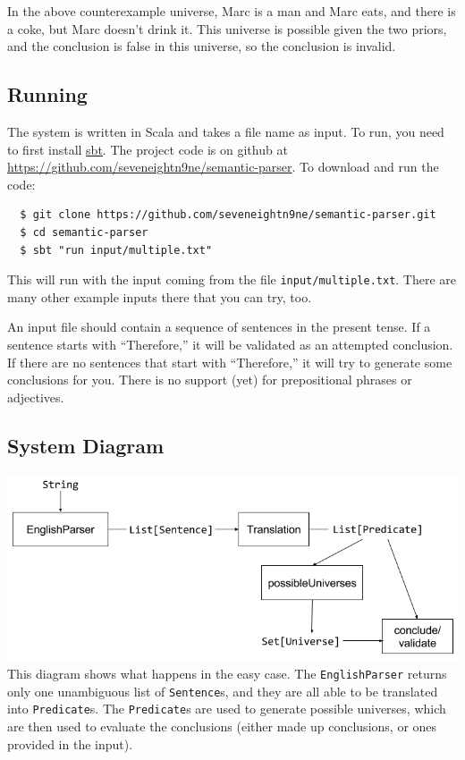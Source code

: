 \documentclass[a4paper, 11pt]{article}
\begin{document}
In the above counterexample universe, Marc is a man and Marc eats, and there is a coke, but Marc doesn't drink it. This universe is possible given the two priors, and the conclusion is false in this universe, so the conclusion is invalid.

\subsection{Running}
The system is written in Scala and takes a file name as input.
To run, you need to first install \href{http://www.scala-sbt.org/}{sbt}.
The project code is on github at \url{https://github.com/seveneightn9ne/semantic-parser}.
To download and run the code:
\begin{lstlisting}
  $ git clone https://github.com/seveneightn9ne/semantic-parser.git
  $ cd semantic-parser
  $ sbt "run input/multiple.txt"
\end{lstlisting}
This will run with the input coming from the file \texttt{input/multiple.txt}. There are many other example inputs there that you can try, too.

An input file should contain a sequence of sentences in the present tense.
If a sentence starts with ``Therefore,'' it will be validated as an attempted conclusion.
If there are no sentences that start with ``Therefore,'' it will try to generate some conclusions for you.
There is no support (yet) for prepositional phrases or adjectives.

\subsection{System Diagram}
\includegraphics[width=\textwidth]{diagram.png}\\
This diagram shows what happens in the easy case.
The \texttt{EnglishParser} returns only one unambiguous list of \texttt{Sentence}s, and they are all able to be translated into \texttt{Predicate}s. The \texttt{Predicate}s are used to generate possible universes, which are then used to evaluate the conclusions (either made up conclusions, or ones provided in the input).
\end{document}
